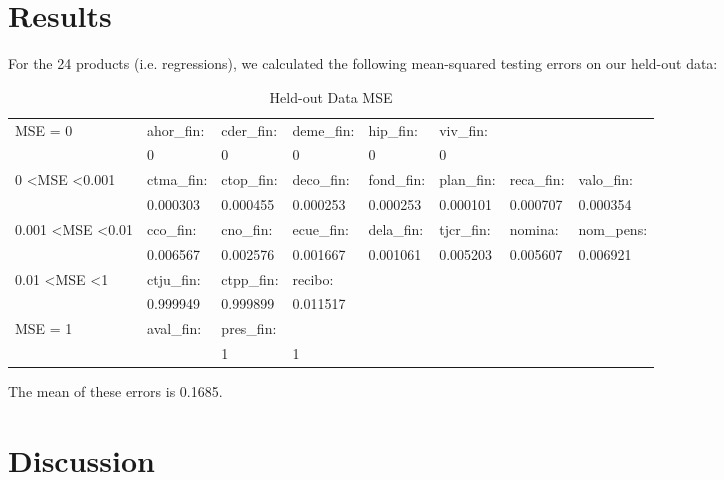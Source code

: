 \documentclass{report}
\begin{document}
\section{Results}

For the 24 products (i.e. regressions), we calculated the following mean-squared testing errors on our held-out data:

\begin{table}[h]\footnotesize
	\centering
	\caption{Held-out Data MSE}
	\label{my-label}
	\begin{tabular}{llllllll}
		\hline
		MSE = 0                            & ahor\_fin:  & cder\_fin: & deme\_fin: & hip\_fin:  & viv\_fin:  &                     &            \\
		& 0                    & 0          & 0          & 0          & 0          &                     &            \\ \hline
		0 \textless MSE \textless 0.001      & ctma\_fin:          & ctop\_fin: & deco\_fin: & fond\_fin: & plan\_fin: & reca\_fin:  & valo\_fin: \\
		& 0.000303            & 0.000455   & 0.000253   & 0.000253   & 0.000101   &  0.000707             & 0.000354   \\ \hline
		0.001 \textless MSE \textless 0.01 & cco\_fin:           & cno\_fin:  & ecue\_fin: & dela\_fin: & tjcr\_fin: & nomina:             & nom\_pens: \\
		& 0.006567            & 0.002576   & 0.001667   & 0.001061   & 0.005203   & 0.005607            & 0.006921   \\ \hline
		0.01 \textless MSE \textless 1     & ctju\_fin:          & ctpp\_fin: & recibo:    &            &            &                     &            \\
		& 0.999949            & 0.999899   & 0.011517   &            &            &                     &            \\ \hline
		MSE = 1                            & aval\_fin:          & pres\_fin: &            &            &            &                     &\\            
		&                    & 1          &1           &            &            &                     & \\ 
		\hline         
	\end{tabular}
\end{table}
The mean of these errors is 0.1685.

\section{Discussion}
\end{document}
